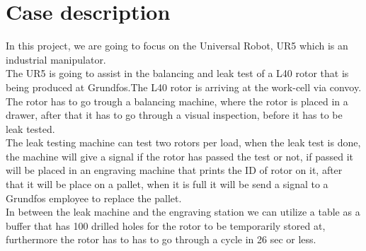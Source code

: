 \chapter{Case description} \label{ch:case description}

In this project, we are going to focus on the Universal Robot, UR5 which is an industrial manipulator.\\
The UR5 is going to assist in the balancing and leak test of a L40 rotor that is being produced at Grundfos.The L40 rotor is arriving at the work-cell via convoy. The rotor has to go trough a balancing machine, where the rotor is placed in a drawer, after that it has to go through a visual inspection, before it has to be leak tested.\\
The leak testing machine can test two rotors per load, when the leak test is done, the machine will give a signal if the rotor has passed the test or not, if passed it will be placed in an engraving machine that prints the ID of rotor on it, after that it will be place on a pallet, when it is full it will be send a signal to a Grundfos employee to replace the pallet.\\ 
In between the leak machine and the engraving station we can utilize a table as a buffer that has 100 drilled holes for the rotor to be temporarily stored at, furthermore the rotor has to has to go through a cycle in 26 sec or less.